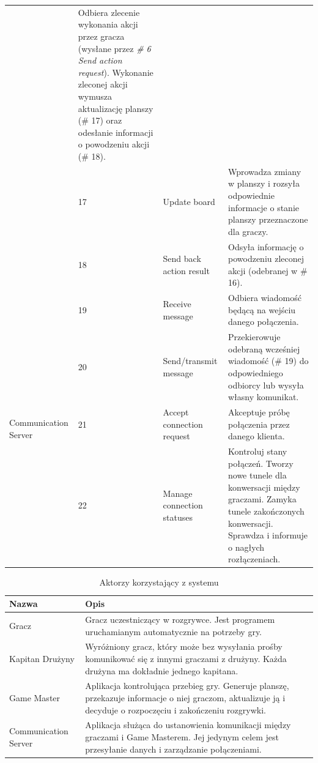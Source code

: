 \documentclass[11pt]{article}
\begin{document}
\begin{longtable}{|p{}|p{}|p{}|p{}|}
& Odbiera zlecenie wykonania akcji przez gracza (wysłane przez \textit{\# 6 Send action request}). Wykonanie zleconej akcji wymusza aktualizację planszy (\# 17) oraz odesłanie informacji o powodzeniu akcji (\# 18).
\\ \cline{2-4}
& 17
& Update board
& Wprowadza zmiany w planszy i rozsyła odpowiednie informacje o stanie planszy przeznaczone dla graczy.
\\ \cline{2-4}
& 18
& Send back action result
& Odsyła informację o powodzeniu zleconej akcji (odebranej w \# 16).
\\ \hline
\multirow{4}{.20\textwidth}{Communication Server}
& 19
& Receive message
& Odbiera wiadomość będącą na wejściu danego połączenia.
\\ \cline{2-4}
& 20
& Send/transmit message
& Przekierowuje odebraną wcześniej wiadomość (\# 19) do odpowiedniego odbiorcy lub wysyła własny komunikat.
\\ \cline{2-4}
& 21
& Accept connection request
& Akceptuje próbę połączenia przez danego klienta.
\\ \cline{2-4}
& 22
& Manage connection statuses
& Kontroluj stany połączeń. Tworzy nowe tunele dla konwersacji między graczami. Zamyka tunele zakończonych konwersacji. Sprawdza i informuje o nagłych rozłączeniach.
\\ \hline
\end{longtable}
\FloatBarrier

\begin{longtable}[!h]{|p{}|p{}|}
\caption{Aktorzy korzystający z systemu}
\\ \hline
Nazwa 
& Opis 
\\ \hline
Gracz 
& Gracz uczestniczący w rozgrywce. Jest programem uruchamianym automatycznie na potrzeby gry. 
\\ \hline
Kapitan Drużyny 
& Wyróżniony gracz, który może bez wysyłania prośby komunikować się z innymi graczami z drużyny. Każda drużyna ma dokładnie jednego kapitana. 
\\ \hline
Game Master
& Aplikacja kontrolująca przebieg gry. Generuje planszę, przekazuje informacje o niej graczom, aktualizuje ją i decyduje o rozpoczęciu i zakończeniu rozgrywki.
\\ \hline
Communication Server
& Aplikacja służąca do ustanowienia komunikacji między graczami i Game Masterem. Jej jedynym celem jest przesyłanie danych i zarządzanie połączeniami.
\\ \hline
\end{longtable}
\FloatBarrier
\end{document}
